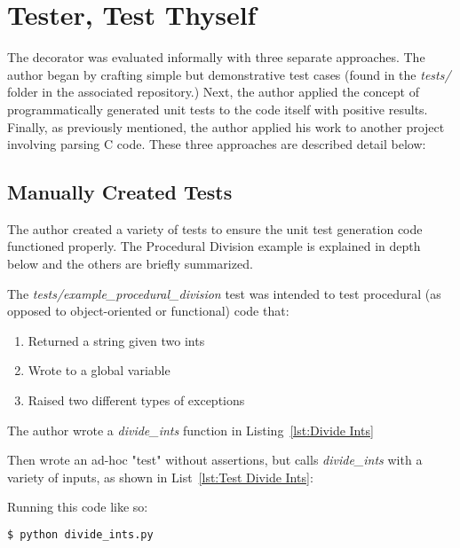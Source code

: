 \section{Tester, Test Thyself}\label{sec:evaluation}

The decorator was evaluated informally with three separate approaches.
The author began by crafting simple but demonstrative test cases 
(found in the \textit{tests/} folder in the associated repository.) Next,
the author applied the concept of programmatically generated unit tests
to the code itself with positive results.  Finally, as previously mentioned, 
the author applied his work to another project involving parsing C code. 
These three approaches are described detail below:

\subsection{Manually Created Tests}\label{sec:eval-1}
The author created a variety of tests to ensure the unit test generation 
code functioned properly. The Procedural Division example is explained in depth
below and the others are briefly summarized.

The \textit{tests/example\_procedural\_division} test was intended 
to test procedural (as opposed to object-oriented or functional) code that:  

\begin{enumerate}
    \item Returned a string given two ints
    \item Wrote to a global variable
    \item Raised two different types of exceptions
\end{enumerate}

The author wrote a \textit{divide\_ints} function in Listing~\ref{lst:Divide Ints}



Then wrote an ad-hoc "test" without assertions, but calls 
\textit{divide\_ints} with a variety of inputs, as shown in List~\ref{lst:Test Divide Ints}:



Running this code like so:

\begin{lstlisting}[language=bash, caption={Executing example to create unit test}]
    $ python divide_ints.py
\end{lstlisting}
    
